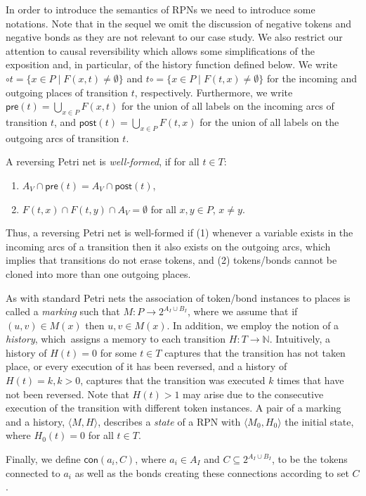 \documentclass[runningheads]{llncs}
\newcommand{\PN}{reversing Petri net }
\newcommand{\guard}[1]{\mathsf{pre}(#1)}
\newcommand{\effects}[1]{\mathsf{post}(#1)}
\newcommand{\connected}{\mathsf{con}}
\newcommand{\state}[2]{\langle {#1}, {#2}\rangle}
\begin{document}
In order to introduce the semantics of RPNs we need to introduce some notations. Note that in 
the sequel we omit the discussion of negative tokens and negative bonds as they are not relevant to our
case study. We also restrict  our attention to causal reversibility which allows some simplifications
of the exposition and, in particular, of the history function defined below.
We write 
$\circ t =   \{x\in P\mid  F(x,t)\neq \emptyset\}$ and  
$ t\circ = \{x\in P\mid F(t,x)\neq \emptyset\}$
for the incoming and outgoing places of transition
$t$, respectively. Furthermore, we write
$\guard{t}  =   \bigcup_{x\in P} F(x,t)$ 
for the union of all labels on the
incoming arcs of  transition $t$, 
and $\effects{t}  =   \bigcup_{x\in P} F(t,x)$
for the union of all labels on the 
outgoing arcs of transition $t$. 
\begin{definition}\label{well-formed}{\rm 
		A \PN is \emph{well-formed}, if for all $t\in T$:
		\begin{enumerate}
			\item $A_V\cap \guard{t} = A_V\cap \effects{t}$,
			\item $ F(t,x)\cap F(t,y)\cap A_V=\emptyset$ for all $x,y\in P$, $x\neq y $. 
		\end{enumerate}
}\end{definition}
Thus, a \PN is well-formed if (1) whenever a variable exists in
the incoming arcs of a transition then it also exists on the outgoing arcs, which implies that transitions do not
erase tokens, and  (2) 
tokens/bonds cannot be cloned into more than one outgoing places.

As with standard Petri nets the association of token/bond instances to places is called a \emph{marking}  such that 
$M: P\rightarrow 2^{A_I\cup B_I}$, where we assume that if $(u,v)\in M(x)$ then $u, v\in M(x)$. 
In addition, we employ the notion of a \emph{history}, which~assigns a memory to each
transition $H : T\rightarrow \mathbb{N}$. 
Intuitively, a history of $H(t) = 0$ for some $t \in T$ captures that the transition has not taken place, or 
every execution of it has been reversed, and a history
of $ H(t)=k, k>0$, captures that the transition was executed  $k$ times that have not been  reversed.
Note that $H(t)>1$ may
arise due to the consecutive execution of the transition with different token
instances. A pair of a marking and a history, $\state{M}{H}$, describes a \emph{state} of a RPN 
with $\state{M_0}{H_0}$ the initial state, where $H_0(t) = 0$ for all $t\in T$. 

Finally, we define $\connected(a_i,C)$, where $a_i\in A_I$ and $C\subseteq 2^{A_I\cup B_I}$,
to be the tokens connected
to $a_i$  as well as the bonds creating these connections according to 
set $C$. 
\end{document}
